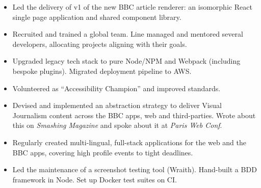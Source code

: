 \documentclass[10pt,a4paper,ragged2e,withhyper]{altacv}
\begin{document}
\begin{paracol}{2}
\begin{itemize}
    \item Led the delivery of v1 of the new BBC article renderer: an isomorphic React single page application and shared component library.
\end{itemize}

\divider


\begin{itemize}
    \item Recruited and trained a global team. Line managed and mentored several developers, allocating projects aligning with their goals.
    \item Upgraded legacy tech stack to pure Node/NPM and Webpack (including bespoke plugins). Migrated deployment pipeline to AWS.
    \item Volunteered as ``Accessibility Champion'' and improved standards.
\end{itemize}

\divider


\begin{itemize}
    \item Devised and implemented an abstraction strategy to deliver Visual Journalism content across the BBC apps, web and third-parties. Wrote about this on \emph{Smashing Magazine} and spoke about it at \emph{Paris Web Conf}.
    \item Regularly created multi-lingual, full-stack applications for the web and the BBC apps, covering high profile events to tight deadlines.
\end{itemize}



\begin{itemize}
    \item Led the maintenance of a screenshot testing tool (Wraith). Hand-built a BDD framework in Node. Set up Docker test suites on CI.
\end{itemize}

\divider



\end{paracol}
\end{document}
